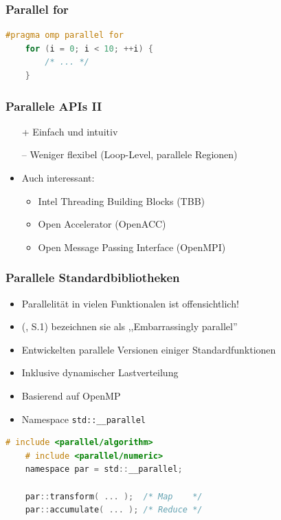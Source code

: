 \documentclass[presentation, shownotes]{beamer}
\begin{document}
\begin{frame}[fragile]
    \frametitle{Parallel for}
    \begin{lstlisting}[language=c,otherkeywords={pragma,for,parallel,omp}]
    #pragma omp parallel for
    for (i = 0; i < 10; ++i) {
        /* ... */
    }
    \end{lstlisting}
\end{frame}

\begin{frame}
\frametitle{Parallele APIs II}
    \begin{itemize}
        \item[+] Einfach und intuitiv
        \item[--] Weniger flexibel (Loop-Level, parallele Regionen)
        \bigskip
        \item Auch interessant:
            \begin{itemize}
            \item Intel Threading Building Blocks (TBB)
            \item Open Accelerator (OpenACC)
            \item Open Message Passing Interface (OpenMPI)
            \end{itemize}
    \end{itemize}
\end{frame}

\begin{frame}
\frametitle{Parallele Standardbibliotheken}
    \begin{itemize}
        \item Parallelität in vielen Funktionalen ist offensichtlich!
        \item \citeauthor{singler2007mcstl} (\citeyear{singler2007mcstl}, S.1) bezeichnen sie als ,,Embarrassingly parallel''
        \item Entwickelten parallele Versionen einiger Standardfunktionen
        \item Inklusive dynamischer Lastverteilung
        \item Basierend auf OpenMP
        \item Namespace \texttt{std::\_\_parallel}
    \end{itemize}
\end{frame}

\begin{frame}[fragile]
    \begin{lstlisting}[language=c]
    # include <parallel/algorithm>
    # include <parallel/numeric>
    namespace par = std::__parallel;

    par::transform( ... );  /* Map    */
    par::accumulate( ... ); /* Reduce */
    \end{lstlisting}
\end{frame}
\end{document}
